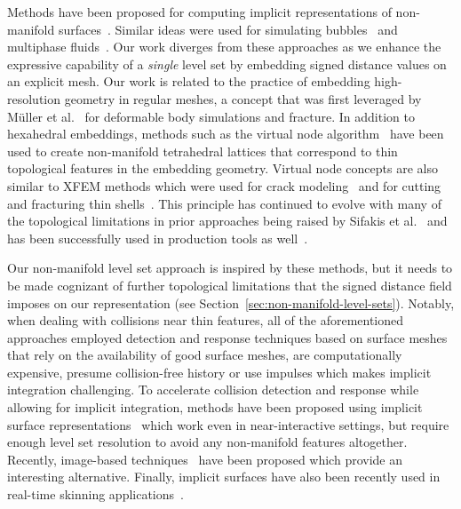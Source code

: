 \documentclass[12pt,oneside,letterpaper]{memoir}
\begin{document}
Methods have been proposed for computing implicit representations of
non-manifold surfaces~\cite{BloomF:1995,YuanYW:2012}. Similar ideas
were used for simulating bubbles~\cite{ZhengYP:2006} and multiphase
fluids~\cite{LosasSSF:2006}. Our work diverges from these approaches
as we enhance the expressive capability of a \emph{single} level set
by embedding signed distance values on an explicit mesh. Our work is
related to the practice of embedding high-resolution geometry in
regular meshes, a concept that was first leveraged by M\"{u}ller et
al.~ for deformable body simulations and
fracture.  In addition to hexahedral embeddings, methods such as the
virtual node algorithm~\cite{MolinBF:2004} have been used to create
non-manifold tetrahedral lattices that correspond to thin topological
features in the embedding geometry. Virtual node concepts are also
similar to XFEM methods which were used for crack
modeling~\cite{MoeesDB:1999} and for cutting and fracturing thin
shells~\cite{KaufmMBGG:2009}. This principle has continued to evolve
with many of the topological limitations in prior approaches being
raised by Sifakis et al.~ and has been
successfully used in production tools as well~\cite{HellrSSST:2009}.

Our non-manifold level set approach is inspired by these methods, but
it needs to be made cognizant of further topological limitations that
the signed distance field imposes on our representation (see
Section~\ref{sec:non-manifold-level-sets}). Notably, when dealing with
collisions near thin features, all of the aforementioned approaches
employed detection and response techniques based on surface
meshes~\cite{BridsFA:2002} that rely on the availability of good
surface meshes, are computationally expensive, presume collision-free
history or use impulses which makes implicit integration
challenging. To accelerate collision detection and response while
allowing for implicit integration, methods have been proposed using
implicit surface representations~\cite{McAdaZSETTS:2011} which work
even in near-interactive settings, but require enough level set
resolution to avoid any non-manifold features altogether. Recently,
image-based techniques~\cite{FaureBAF:2008,WangFP:2012} have been
proposed which provide an interesting alternative.  Finally, implicit
surfaces have also been recently used in real-time skinning
applications~\cite{VaillBGCRWGP:2013,VaillGBWC:2014}.







\printglossaries

\end{document}
